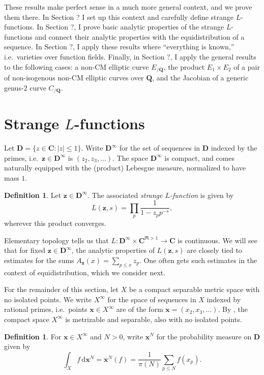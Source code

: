 \documentclass{article}
\newcommand{\bC}{\mathbf{C}}
\newcommand{\bD}{\mathbf{D}}
\newcommand{\bQ}{\mathbf{Q}}
\newcommand{\bx}{{\boldsymbol x}}
\newcommand{\bz}{{\boldsymbol z}}
\newcommand{\dd}{\mathrm{d}}
\theoremstyle{definition}
\newtheorem{definition}[subsection]{Definition}
\begin{document}
These results make perfect sense in a much more general context, and we
prove them there. In Section ? I set up this context and 
carefully define strange $L$-functions. In Section ?, I 
prove basic analytic properties of the strange $L$-functions and 
connect their analytic properties with the equidistribution of a sequence. 
In Section ?, I apply these results where ``everything is 
known,'' i.e.~varieties over function fields.
Finally, in Section ?, I apply the general results to the 
following cases: a non-CM elliptic curve $E_{/\bQ}$, the product 
$E_1\times E_2$ of a pair of non-isogenous non-CM elliptic curves over $\bQ$, 
and the Jacobian of a generic genus-$2$ curve $C_{/\bQ}$. 





\section{Strange $L$-functions}\label{sec:strange-L}

Let $\bD=\{z\in \bC : |z|\leqslant 1\}$. Write $\bD^\infty$ for the set of 
sequences in $\bD$ indexed by the primes, i.e.~$\bz\in\bD^\infty$ is 
$(z_2,z_3,\dots)$. The space $\bD^\infty$ is compact, and comes naturally 
equipped with the (product) Lebesgue measure, normalized to have mass $1$. 

\begin{definition}
Let $\bz\in\bD^\infty$. The associated \emph{strange $L$-function} is given by 
\[
	L(\bz,s) = \prod_p \frac{1}{1-z_p p^{-s}} ,
\]
wherever this product converges. 
\end{definition}

Elementary topology tells us that $L\colon \bD^\infty\times \bC^{\Re>1}\to \bC$ 
is continuous. 
We will see that for fixed $\bz\in \bD^\infty$, the analytic properties of 
$L(\bz,s)$ are closely tied to 
estimates for the sums $A_\bz(x) = \sum_{p\leqslant x} z_p$. One 
often gets such estimates in the context of equidistribution, which we consider 
next.

For the remainder of this section, let $X$ be a compact separable metric space with no 
isolated points. We write $X^\infty$ for the space of sequences in $X$ indexed 
by rational primes, i.e.~points $\bx\in X^\infty$ are of the form 
$\bx=(x_2,x_3,\dots)$. By \cite[Cor.2.3.16, Th.4.2.2]{engelking-1989}, the 
compact space $X^\infty$ is metrizable and separable, also with no isolated 
points. 

\begin{definition}
For $\bx\in X^\infty$ and $N>0$, write $\bx^N$ for the probability measure on 
$\bD$ given by 
\[
	\int_X f\, \dd \bx^N = \bx^N(f) = \frac{1}{\pi(N)} \sum_{p\leqslant N} f(x_p) .
\]
\end{definition}
\end{document}
